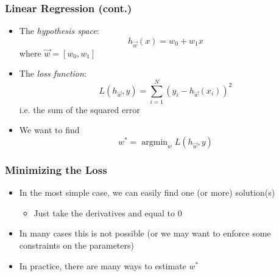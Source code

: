 \documentclass{beamer}
\DeclareMathOperator*{\argmin}{argmin}
\begin{document}
\newcommand{\ww}{\vec{w}}
\begin{frame}
    \frametitle{Linear Regression (cont.)}
    \begin{itemize}
    \item The \emph{hypothesis space}:
        \begin{displaymath}
            h_{\ww}(x) = w_0 + w_1x
        \end{displaymath}
        where $\ww = [w_0, w_1]$
    \item The \emph{loss function}:
        \begin{displaymath}
            L(h_{\ww},y) = \sum_{i=1}^N(y_i - h_{\ww}(x_i))^2
        \end{displaymath}
        i.e. the sum of the squared error
    \item We want to find
        \begin{displaymath}
            w^* = \argmin_w L(h_{\ww},y)
        \end{displaymath}
    \end{itemize}
\end{frame}

\begin{frame}
    \frametitle{Minimizing the Loss}
    \begin{itemize}
    \item In the most simple case, we can easily find one (or more) solution(s)
        \begin{itemize}
        \item Just take the derivatives and equal to $0$
        \end{itemize}
    \item In many cases this is not possible (or we may want to enforce some
        constraints on the parameters) %
    \item In practice, there are many ways to estimate $w^*$
    \end{itemize}
\end{frame}
\end{document}
